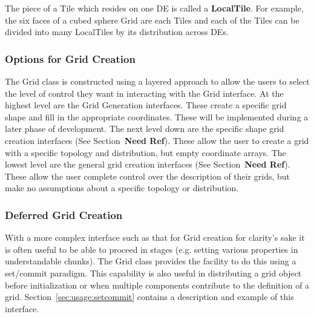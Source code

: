 The piece of a Tile which resides on one DE is
called a {\bf LocalTile}. For example, the six faces of a cubed sphere
Grid are each Tiles and each of the Tiles can be divided into many
LocalTiles by its distribution across DEs. 

\subsubsection{Options for Grid Creation} 

The Grid class is constructed using a layered approach to allow the 
users to select the level of control they want in interacting with
the Grid interface. At the highest level are the Grid Generation interfaces. 
These create a specific grid shape and fill in the appropriate coordinates. 
These will be implemented during a later phase of development. The
next level down are the specific shape grid creation interfaces (See Section~\textbf{Need Ref}). 
These allow the user to create a grid with a specific topology and 
distribution, but empty coordinate arrays. The lowest level are
the general grid creation interfaces (See Section~\textbf{Need Ref}). These allow the user
complete control over the description of their grids, but
make no assumptions about a specific topology or distribution. 

\subsubsection{Deferred Grid Creation}
 With a more complex interface such as that for Grid creation
for clarity's sake it is often useful to be able to proceed in stages
(e.g. setting various properties in understandable chunks). The 
Grid class provides the facility to do this using a set/commit paradigm.
This capability is also useful in distributing a grid object before
initialization or when multiple components contribute to the 
definition of a grid. Section~\ref{sec:usage:setcommit}
contains a description and example of this interface. 

